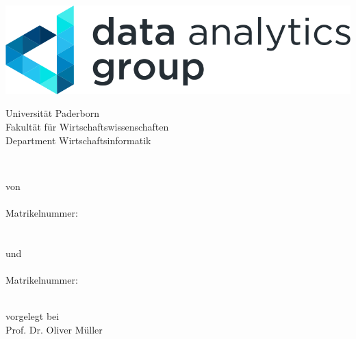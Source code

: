 \vfil

\begin{titlepage}

        \begin{center}
        	\includegraphics[scale=1.]{img/data_analytics_group.png}
        \end{center}
        
        \vspace{7ex}
        
        \begin{center}
            
            Universität Paderborn\\
            Fakultät für Wirtschaftswissenschaften\\
            Department Wirtschaftsinformatik\\
            
            \vspace{7ex}
            
            \Large
            \abschlussarbeit\\
            
            \vspace{4ex}
            
            \textbf{\sffamily{\titel}}
            
            \vspace{5ex}
            
            \normalsize
            
            von\\
            \nameFirst\\
            Matrikelnummer:~\matrikelnummerFirst\\
            \adresseFirst\\
            \upbmailFirst\\
            und\\
            \nameSecond\\
            Matrikelnummer:~\matrikelnummerSecond\\
            \adresseSecond\\
            \upbmailSecond
            
            \vspace{4ex}
            
            vorgelegt bei\\
            Prof. Dr. Oliver Müller\\
            \zweitpruefer\\
            
            \vspace{4ex}
            
            \abgabedatum
            
        \end{center}
        
    \end{titlepage}
    
\vfil